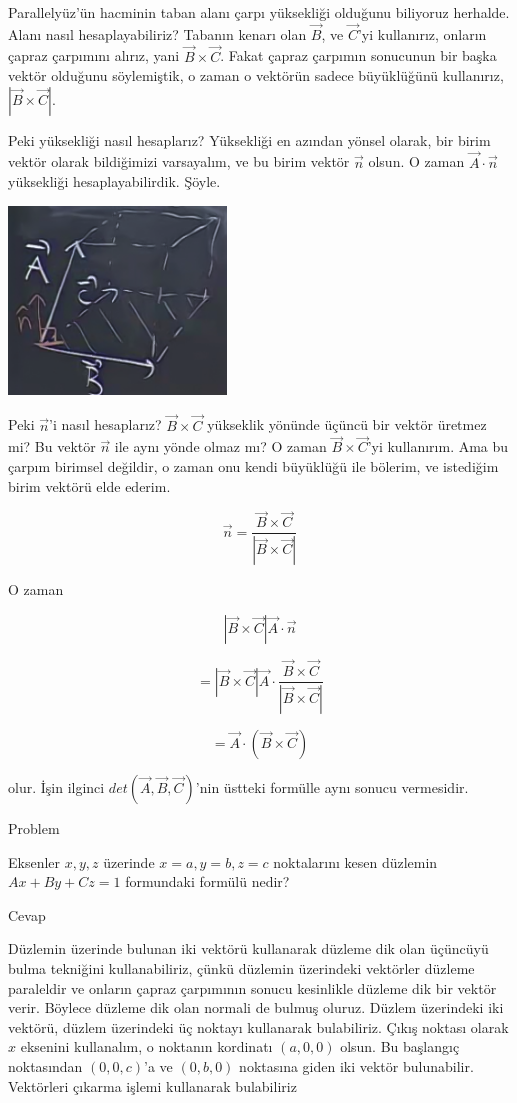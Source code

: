 \documentclass[12pt,fleqn]{article}\usepackage{../../common}
\begin{document}
Parallelyüz'ün hacminin taban alanı çarpı yüksekliği olduğunu biliyoruz
herhalde. Alanı nasıl hesaplayabiliriz? Tabanın kenarı olan $\vec{B}$, ve
$\vec{C}$'yi kullanırız, onların çapraz çarpımını alırız, yani $\vec{B}\times
\vec{C}$. Fakat çapraz çarpımın sonucunun bir başka vektör olduğunu söylemiştik,
o zaman o vektörün sadece büyüklüğünü kullanırız, $|\vec{B}\times \vec{C}|$.

Peki yüksekliği nasıl hesaplarız? Yüksekliği en azından yönsel olarak, bir birim
vektör olarak bildiğimizi varsayalım, ve bu birim vektör $\vec{n}$ olsun. O
zaman $\vec{A}\cdot\vec{n}$ yüksekliği hesaplayabilirdik. Şöyle.

\begin{center}
\includegraphics[height=5cm]{2_14.png}
\end{center}

Peki $\vec{n}$'i nasıl hesaplarız?  $\vec{B}\times \vec{C}$ yükseklik yönünde
üçüncü bir vektör üretmez mi? Bu vektör $\vec{n}$ ile aynı yönde olmaz mı? O
zaman $\vec{B}\times \vec{C}$'yi kullanırım. Ama bu çarpım birimsel değildir, o
zaman onu kendi büyüklüğü ile bölerim, ve istediğim birim vektörü elde ederim.

$$ \vec{n} = \frac{\vec{B}\times \vec{C}}{|\vec{B}\times \vec{C}|} $$

O zaman

$$ |\vec{B}\times \vec{C}| \vec{A}\cdot\vec{n} $$

$$  = |\vec{B}\times \vec{C}| \vec{A}\cdot \frac{\vec{B}\times 
\vec{C}}{|\vec{B}\times \vec{C}|}  $$

$$  = \vec{A}\cdot (\vec{B}\times \vec{C})  $$

olur. İşin ilginci $det(\vec{A},\vec{B},\vec{C})$'nin üstteki formülle 
aynı sonucu vermesidir. 

Problem

Eksenler $x,y,z$ üzerinde $x=a,y=b,z=c$ noktalarını kesen düzlemin
$Ax+By+Cz=1$ formundaki formülü nedir?

Cevap

Düzlemin üzerinde bulunan iki vektörü kullanarak düzleme dik olan üçüncüyü bulma
tekniğini kullanabiliriz, çünkü düzlemin üzerindeki vektörler düzleme paraleldir
ve onların çapraz çarpımının sonucu kesinlikle düzleme dik bir vektör verir.
Böylece düzleme dik olan normali de bulmuş oluruz. Düzlem üzerindeki iki
vektörü, düzlem üzerindeki üç noktayı kullanarak bulabiliriz. Çıkış noktası
olarak $x$ eksenini kullanalım, o noktanın kordinatı $(a,0,0)$ olsun. Bu
başlangıç noktasından $(0,0,c)$'a ve $(0,b,0)$ noktasına giden iki vektör
bulunabilir. Vektörleri çıkarma işlemi kullanarak bulabiliriz
\end{document}
